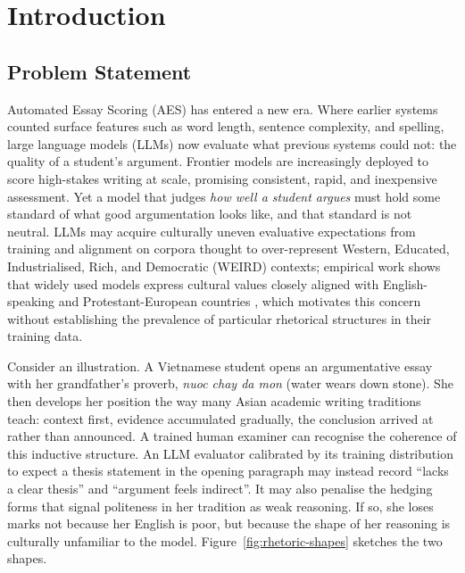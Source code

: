 \chapter{Introduction}
\label{chap:introduction}

\section{Problem Statement}
\label{sec:problem}

Automated Essay Scoring (AES) has entered a new era. Where earlier
systems counted surface features such as word length, sentence
complexity, and spelling, large language models (LLMs) now evaluate what previous
systems could not: the quality of a student's argument. Frontier models
are increasingly deployed to score high-stakes writing at scale,
promising consistent, rapid, and inexpensive assessment. Yet a model
that judges \emph{how well a student argues} must hold some standard of
what good argumentation looks like, and that standard is not neutral.
LLMs may acquire culturally uneven evaluative expectations from
training and alignment on corpora thought to over-represent Western,
Educated, Industrialised, Rich, and Democratic (WEIRD) contexts;
empirical work shows that widely used models express cultural values
closely aligned with English-speaking and Protestant-European
countries \citep{tao2024cultural}, which motivates this concern
without establishing the prevalence of particular rhetorical
structures in their training data.

Consider an illustration. A Vietnamese student opens an argumentative
essay with her grandfather's proverb, \emph{nuoc chay da mon} (water
wears down stone).
She then develops her position the way many Asian
academic writing traditions teach: context first, evidence accumulated
gradually, the conclusion arrived at rather than announced. A trained
human examiner can recognise the coherence of this inductive structure.
An LLM evaluator calibrated by its training distribution to expect a
thesis statement in the opening paragraph may instead record ``lacks a
clear thesis'' and ``argument feels indirect''. It may also penalise the
hedging forms that signal politeness in her tradition as weak
reasoning. If so, she loses marks not because her English is poor, but
because the shape of her reasoning is culturally unfamiliar to the
model. Figure~\ref{fig:rhetoric-shapes} sketches the two shapes.

